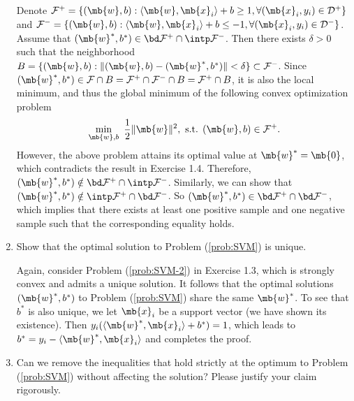 \begin{exercise}
\begin{enumerate}
            \begin{solution}
                Denote $\mathcal{F}^+=\{(\mb{w},b): \langle \mb{w}, \mb{x}_i \rangle + b \ge 1, \forall (\mb{x}_i, y_i) \in \mathcal{D}^+\}$ and $\mathcal{F}^-=\{(\mb{w},b): \langle \mb{w}, \mb{x}_i \rangle + b \le -1, \forall (\mb{x}_i, y_i) \in \mathcal{D}^-\}$. Assume that $(\mb{w}^*,b^*) \in \bd \mathcal{F}^+ \cap \intp \mathcal{F}^-$. Then there exists $\delta > 0$ such that the neighborhood $B = \{(\mb{w},b): \|(\mb{w},b) - (\mb{w}^*,b^*)\| < \delta\} \subset \mathcal{F}^-$. Since $(\mb{w}^*,b^*) \in \mathcal{F} \cap B = \mathcal{F}^+ \cap \mathcal{F}^- \cap B = \mathcal{F}^+ \cap B$, it is also the local minimum, and thus the global minimum of the following convex optimization problem
                \begin{align*}
                    \min_{\mb{w},b}\,\,\frac{1}{2}\|\mb{w}\|^2, \text{ s.t. } (\mb{w},b) \in \mathcal{F}^+.
                \end{align*}
                However, the above problem attains its optimal value at $\mb{w}^* = \mb{0}$, which contradicts the result in Exercise 1.4. Therefore, $(\mb{w}^*,b^*) \notin \bd \mathcal{F}^+ \cap \intp \mathcal{F}^-$. Similarly, we can show that $(\mb{w}^*,b^*) \notin \intp \mathcal{F}^+ \cap \bd \mathcal{F}^-$. So $(\mb{w}^*,b^*) \in \bd \mathcal{F}^+ \cap \bd \mathcal{F}^-$, which implies that there exists at least one positive sample and one negative sample such that the corresponding equality holds.
            \end{solution}


        \item Show that the optimal solution to Problem (\ref{prob:SVM}) is unique.

            \begin{solution}
                Again, consider Problem (\ref{prob:SVM-2}) in Exercise 1.3, which is strongly convex and admits a unique solution. It follows that the optimal solutions $(\mb{w}^*, b^*)$ to Problem (\ref{prob:SVM}) share the same $\mb{w}^*$. To see that $b^*$ is also unique, we let $\mb{x}_i$ be a support vector (we have shown its existence). Then $y_i(\langle \mb{w}^*, \mb{x}_i \rangle + b^*) = 1$, which leads to $b^* = y_i - \langle \mb{w}^*, \mb{x}_i \rangle$ and completes the proof.
            \end{solution}


        \item Can we remove the inequalities that hold strictly at the optimum to Problem (\ref{prob:SVM}) without affecting the solution? Please justify your claim rigorously.


\end{enumerate}
\end{exercise}
